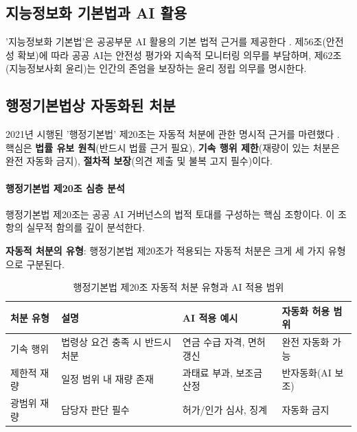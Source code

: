 \subsection{지능정보화 기본법과 AI 활용}
\label{sec:18.2.1}

'지능정보화 기본법'은 공공부문 AI 활용의 기본 법적 근거를 제공한다 \cite{korea2020intel}. 제56조(안전성 확보)에 따라 공공 AI는 안전성 평가와 지속적 모니터링 의무를 부담하며, 제62조(지능정보사회 윤리)는 인간의 존엄을 보장하는 윤리 정립 의무를 명시한다.

\subsection{행정기본법상 자동화된 처분}
\label{sec:18.2.2}

2021년 시행된 '행정기본법' 제20조는 자동적 처분에 관한 명시적 근거를 마련했다 \cite{korea2021admin}. 핵심은 \textbf{법률 유보 원칙}(반드시 법률 근거 필요), \textbf{기속 행위 제한}(재량이 있는 처분은 완전 자동화 금지), \textbf{절차적 보장}(의견 제출 및 불복 고지 필수)이다.

\paragraph{행정기본법 제20조 심층 분석}

행정기본법 제20조는 공공 AI 거버넌스의 법적 토대를 구성하는 핵심 조항이다. 이 조항의 실무적 함의를 깊이 분석한다.

\textbf{자동적 처분의 유형}: 행정기본법 제20조가 적용되는 자동적 처분은 크게 세 가지 유형으로 구분된다.

\begin{table}[htbp]
\centering
\caption{행정기본법 제20조 자동적 처분 유형과 AI 적용 범위}
\label{tab:18_admin_types}
\begin{tabularx}{\textwidth}{p{2.5cm}Xp{3cm}p{2.5cm}}
\toprule
\textbf{처분 유형} & \textbf{설명} & \textbf{AI 적용 예시} & \textbf{자동화 허용 범위} \\
\midrule
기속 행위 & 법령상 요건 충족 시 반드시 처분 & 연금 수급 자격, 면허 갱신 & 완전 자동화 가능 \\
제한적 재량 & 일정 범위 내 재량 존재 & 과태료 부과, 보조금 산정 & 반자동화(AI 보조) \\
광범위 재량 & 담당자 판단 필수 & 허가/인가 심사, 징계 & 자동화 금지 \\
\bottomrule
\end{tabularx}
\end{table}


